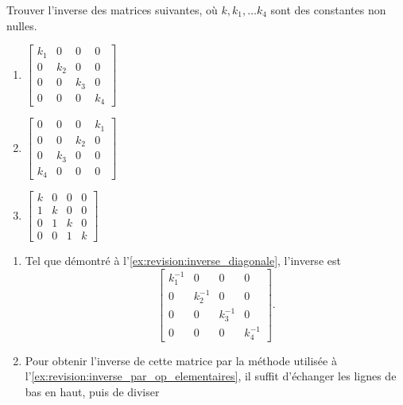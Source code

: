 \begin{exercice}
  Trouver l'inverse des matrices suivantes, où $k, k_1, \dots k_4$
  sont des cons\-tantes non nulles.
  \begin{multicols}{3}
    \begin{enumerate}
    \item $%
      \begin{bmatrix}
        k_1 & 0 & 0 & 0 \\
        0 & k_2 & 0 & 0 \\
        0 & 0 & k_3 & 0 \\
        0 & 0 & 0 & k_4
      \end{bmatrix}$
    \item $%
      \begin{bmatrix}
        0 & 0 & 0 & k_1 \\
        0 & 0 & k_2 & 0 \\
        0 & k_3 & 0 & 0 \\
        k_4 & 0 & 0 & 0
      \end{bmatrix}$
    \item $%
      \begin{bmatrix}
        k & 0 & 0 & 0 \\
        1 & k & 0 & 0 \\
        0 & 1 & k & 0 \\
        0 & 0 & 1 & k
      \end{bmatrix}$
    \end{enumerate}
  \end{multicols}
  \begin{sol}
    \begin{enumerate}
    \item Tel que démontré à l'\autoref{ex:revision:inverse_diagonale},
      l'inverse est
      \begin{displaymath}
        \begin{bmatrix}
          k_1^{-1} & 0 & 0 & 0 \\
          0 & k_2^{-1} & 0 & 0 \\
          0 & 0 & k_3^{-1} & 0 \\
          0 & 0 & 0 & k_4^{-1}
        \end{bmatrix}.
      \end{displaymath}
    \item Pour obtenir l'inverse de cette matrice par la méthode
      utilisée à l'\autoref{ex:revision:inverse_par_op_elementaires},
      il suffit d'échanger les lignes de bas en haut, puis de diviser

\end{enumerate}
\end{sol}
\end{exercice}
